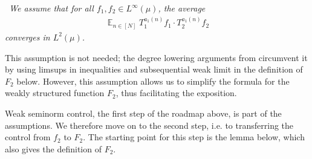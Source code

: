 \documentclass[11pt]{amsart}
\theoremstyle{definition}
\DeclareMathOperator*{\E}{\mathbb{E}}
\newcommand{\1}{{\mathbf{1}}}
\begin{document}
\emph{\ We assume that for all $f_1, f_2\in L^\infty(\mu)$, the average 
\begin{align*}
    \E_{n\in[N]}T_1^{a_1(n)}f_1 \cdot T_2^{a_1(n)}f_2
\end{align*}
converges in $L^2(\mu)$.
}

This assumption is not needed; the degree lowering arguments from \cite{Fr21, FrKu22a} circumvent it by using limsups in inequalities and subsequential weak limit in the definition of $F_2$ below. However, this assumption allows us to simplify the formula for the weakly structured function $F_2$, thus facilitating the exposition. 

Weak seminorm control, the first step of the roadmap above, is part of the assumptions. We therefore move on to the second step, i.e. to transferring the control from $f_2$ to $F_2$. The starting point for this step is the lemma below, which also gives the definition of $F_2$.
\end{document}
